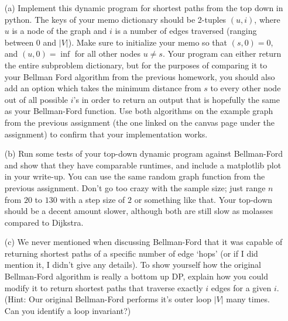 \documentclass[12pt]{article}
\begin{document}
\begin{enumerate}
\begin{itemize}
        \item[(a)] Implement this dynamic program for shortest paths from the top down in python. The keys of your memo dictionary should be 2-tuples $(u,i)$, where $u$ is a node of the graph and $i$ is a number of edges traversed (ranging between $0$ and $|V|$). Make sure to initialize your memo so that $(s,0) = 0$, and $(u,0) = \inf$ for all other nodes $u \neq s$. Your program can either return the entire subproblem dictionary, but for the purposes of comparing it to your Bellman Ford algorithm from the previous homework, you should also add an option which takes the minimum distance from $s$ to every other node out of all possible $i$'s in order to return an output that is hopefully the same as your Bellman-Ford function. Use both algorithms on the example graph from the previous assignment (the one linked on the canvas page under the assignment) to confirm that your implementation works.
        \item[(b)] Run some tests of your top-down dynamic program against Bellman-Ford and show that they have comparable runtimes, and include a matplotlib plot in your write-up. You can use the same random graph function from the previous assignment. Don't go too crazy with the sample size; just range $n$ from $20$ to $130$ with a step size of $2$ or something like that. Your top-down should be a decent amount slower, although both are still slow as molasses compared to Dijkstra. \
        \item[(c)] We never mentioned when discussing Bellman-Ford that it was capable of returning shortest paths of a specific number of edge `hops' (or if I did mention it, I didn't give any details). To show yourself how the original Bellman-Ford algorithm is really a bottom up DP, explain how you could modify it to return shortest paths that traverse exactly $i$ edges for a given $i$. (Hint: Our original Bellman-Ford performs it's outer loop $|V|$ many times. Can you identify a loop invariant?) 
     \end{itemize}
\end{enumerate}
\end{document}
